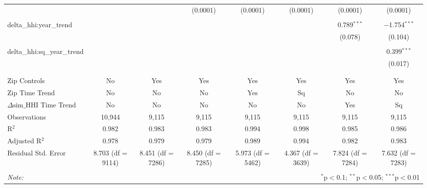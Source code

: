 \begin{table}[H]
{\begin{tabular}{@{\extracolsep{5pt}}lccccccc}
   &  &  & (0.0001) & (0.0001) & (0.0001) & (0.0001) & (0.0001) \\  

   & & & & & & & \\  

  delta\_hhi:year\_trend &  &  &  &  &  & 0.789$^{***}$ & $-$1.754$^{***}$ \\  

   &  &  &  &  &  & (0.078) & (0.104) \\  

   & & & & & & & \\  

  delta\_hhi:sq\_year\_trend &  &  &  &  &  &  & 0.399$^{***}$ \\  

   &  &  &  &  &  &  & (0.017) \\  

   & & & & & & & \\  

 \hline \\[-1.8ex]  

 Zip Controls & No & Yes & Yes & Yes & Yes & Yes & Yes \\  

 Zip Time Trend & No & No & No & Yes & Sq & No & No \\  

 $\Delta \text{sim\_HHI}$ Time Trend & No & No & No & No & No & Yes & Sq \\  

 Observations & 10,944 & 9,115 & 9,115 & 9,115 & 9,115 & 9,115 & 9,115 \\  

 R$^{2}$ & 0.982 & 0.983 & 0.983 & 0.994 & 0.998 & 0.985 & 0.986 \\  

 Adjusted R$^{2}$ & 0.978 & 0.979 & 0.979 & 0.989 & 0.994 & 0.982 & 0.983 \\  

 Residual Std. Error & 8.703 (df = 9114) & 8.451 (df = 7286) & 8.450 (df = 7285) & 5.973 (df = 5462) & 4.367 (df = 3639) & 7.824 (df = 7284) & 7.632 (df = 7283) \\  

 \hline  

 \hline \\[-1.8ex]  

 \textit{Note:}  & \multicolumn{7}{r}{$^{*}$p$<$0.1; $^{**}$p$<$0.05; $^{***}$p$<$0.01} \\  

 \end{tabular}}  

 \end{table}  

